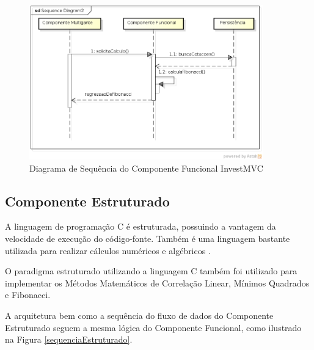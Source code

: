 \begin{figure}[H]
\centering
\includegraphics[width=0.9\textwidth]{figuras/sequenciaFuncional}
\caption{Diagrama de Sequência do Componente Funcional InvestMVC} 
\label{sequenciaFuncional}
\end{figure}

\subsection{Componente Estruturado}

A linguagem de programação C é estruturada, possuindo a vantagem da velocidade de execução do código-fonte. Também é uma linguagem bastante utilizada para realizar cálculos numéricos e algébricos \cite{gustavo}. 

O paradigma estruturado utilizando a linguagem C também foi utilizado para implementar os Métodos Matemáticos de Correlação Linear, Mínimos Quadrados e Fibonacci.

A arquitetura bem como a sequência do fluxo de dados do Componente Estruturado seguem a mesma lógica do Componente Funcional, como ilustrado na Figura \ref{sequenciaEstruturado}.

